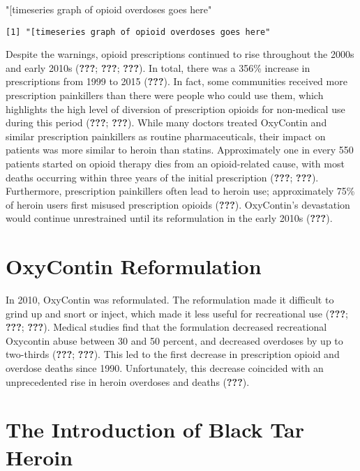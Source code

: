 \documentclass[12pt,twoside]{reedthesis}
\newenvironment{Shaded}{\begin{snugshade}}{\end{snugshade}}
\newcommand{\StringTok}[1]{\textcolor[rgb]{0.31,0.60,0.02}{#1}}
\begin{document}
\begin{Shaded}
\begin{Highlighting}[]
\StringTok{"[timeseries graph of opioid overdoses goes here"}
\end{Highlighting}
\end{Shaded}
\begin{verbatim}
[1] "[timeseries graph of opioid overdoses goes here"
\end{verbatim}
Despite the warnings, opioid prescriptions continued to rise throughout the 2000s and early 2010s ({\textbf{???}}; {\textbf{???}}; {\textbf{???}}). In total, there was a 356\% increase in prescriptions from 1999 to 2015 ({\textbf{???}}). In fact, some communities received more prescription painkillers than there were people who could use them, which highlights the high level of diversion of prescription opioids for non-medical use during this period ({\textbf{???}}; {\textbf{???}}). While many doctors treated OxyContin and similar prescription painkillers as routine pharmaceuticals, their impact on patients was more similar to heroin than statins. Approximately one in every 550 patients started on opioid therapy dies from an opioid-related cause, with most deaths occurring within three years of the initial prescription ({\textbf{???}}; {\textbf{???}}). Furthermore, prescription painkillers often lead to heroin use; approximately 75\% of heroin users first misused prescription opioids ({\textbf{???}}). OxyContin's devastation would continue unrestrained until its reformulation in the early 2010s ({\textbf{???}}).

\hypertarget{oxycontin-reformulation}{%
\section{OxyContin Reformulation}\label{oxycontin-reformulation}}

In 2010, OxyContin was reformulated. The reformulation made it difficult to grind up and snort or inject, which made it less useful for recreational use ({\textbf{???}}; {\textbf{???}}; {\textbf{???}}). Medical studies find that the formulation decreased recreational Oxycontin abuse between 30 and 50 percent, and decreased overdoses by up to two-thirds ({\textbf{???}}; {\textbf{???}}). This led to the first decrease in prescription opioid and overdose deaths since 1990. Unfortunately, this decrease coincided with an unprecedented rise in heroin overdoses and deaths ({\textbf{???}}).

\hypertarget{the-introduction-of-black-tar-heroin}{%
\section{The Introduction of Black Tar Heroin}\label{the-introduction-of-black-tar-heroin}}
\end{document}
